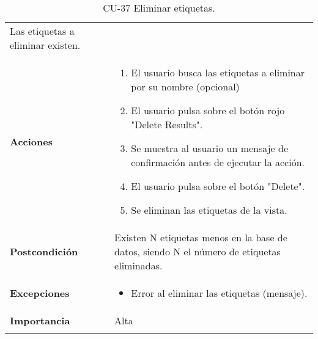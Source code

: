 \begin{longtable}[]{@{}ll@{}}
\begin{minipage}[t]{0.74\columnwidth}
Las etiquetas a eliminar existen.\strut
\end{minipage}\tabularnewline
\begin{minipage}[t]{0.21\columnwidth}\raggedright
\textbf{Acciones}\strut
\end{minipage} & \begin{minipage}[t]{0.74\columnwidth}\raggedright
\begin{enumerate}
\def\labelenumi{\arabic{enumi}.}
\tightlist
\item
  El usuario busca las etiquetas a eliminar por su nombre (opcional)
\item
  El usuario pulsa sobre el botón rojo "Delete Results".
\item
  Se muestra al usuario un mensaje de confirmación antes de ejecutar la
  acción.
\item
  El usuario pulsa sobre el botón "Delete".
\item
  Se eliminan las etiquetas de la vista.
\end{enumerate}\strut
\end{minipage}\tabularnewline
\begin{minipage}[t]{0.21\columnwidth}\raggedright
\textbf{Postcondición}\strut
\end{minipage} & \begin{minipage}[t]{0.74\columnwidth}\raggedright
Existen N etiquetas menos en la base de datos, siendo N el número de
etiquetas eliminadas.\strut
\end{minipage}\tabularnewline
\begin{minipage}[t]{0.21\columnwidth}\raggedright
\textbf{Excepciones}\strut
\end{minipage} & \begin{minipage}[t]{0.74\columnwidth}\raggedright
\begin{itemize}
\tightlist
\item
  Error al eliminar las etiquetas (mensaje).
\end{itemize}\strut
\end{minipage}\tabularnewline
\begin{minipage}[t]{0.21\columnwidth}\raggedright
\textbf{Importancia}\strut
\end{minipage} & \begin{minipage}[t]{0.74\columnwidth}\raggedright
Alta\strut
\end{minipage}\tabularnewline
\bottomrule
\caption{CU-37 Eliminar etiquetas.}
\end{longtable}

